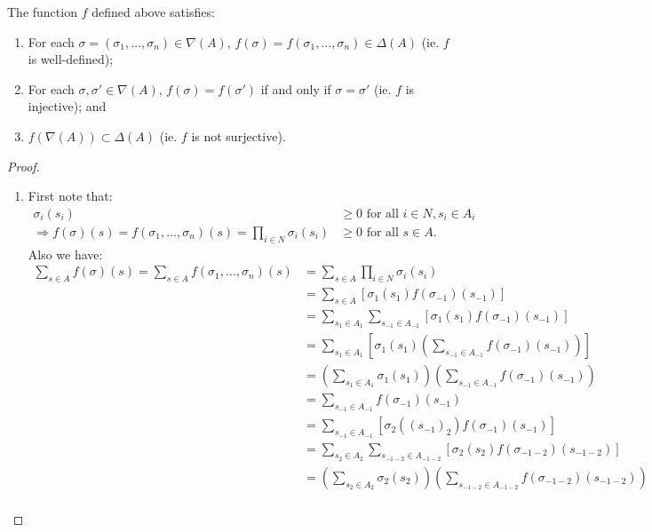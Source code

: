 	\begin{proposition}
		The function $f$ defined above satisfies:
		\begin{enumerate}
			\item For each $\sigma = (\sigma_1, \ldots, \sigma_n) \in \nabla(A)$, $f(\sigma) = f(\sigma_1, \ldots, \sigma_n) \in \Delta(A)$ (ie. $f$ is well-defined);
			\item For each $\sigma, \sigma' \in \nabla(A)$, $f(\sigma) = f(\sigma')$ if and only if $\sigma = \sigma'$ (ie. $f$ is injective); and
			\item $f\left(\nabla(A)\right) \subset \Delta(A)$ (ie. $f$ is not surjective).
		\end{enumerate}
		
		\begin{proof}
			\begin{enumerate}
				\item First note that:
				\begin{align*}
					\sigma_i(s_i) &\geq 0 \text{ for all } i \in N, s_i \in A_i \\
					\Rightarrow f(\sigma)(s) = f(\sigma_1, \ldots, \sigma_n)(s) = \prod_{i \in N} \sigma_i(s_i) &\geq 0 \text{ for all } s \in A.
				\end{align*}
				Also we have:
				\begin{align*}
					\sum_{s \in A}f(\sigma)(s) = \sum_{s \in A}f(\sigma_1, \ldots, \sigma_n)(s) &= \sum_{s \in A}\prod_{i \in N}\sigma_i(s_i) \\
					&= \sum_{s \in A}\left[\sigma_1(s_1)f(\sigma_{-1})(s_{-1})\right] \\
					&= \sum_{s_1 \in A_1}\sum_{s_{-1} \in A_{-1}}\left[\sigma_1(s_1)f(\sigma_{-1})(s_{-1})\right] \\
					&= \sum_{s_1 \in A_1}\left[\sigma_1(s_1)\left(\sum_{s_{-1} \in A_{-1}}f(\sigma_{-1})(s_{-1})\right)\right] \\
					&= \left(\sum_{s_1 \in A_1}\sigma_1(s_1)\right)\left(\sum_{s_{-1} \in A_{-1}}f(\sigma_{-1})(s_{-1})\right) \\
					&= \sum_{s_{-1} \in A_{-1}}f(\sigma_{-1})(s_{-1}) \\
					&= \sum_{s_{-1} \in A_{-1}} \left[\sigma_2({(s_{-1})}_2)f(\sigma_{-1})(s_{-1})\right] \\
					&= \sum_{s_2 \in A_2}\sum_{s_{-1-2} \in A_{-1-2}} \left[\sigma_2(s_{2})f(\sigma_{-1-2})(s_{-1-2})\right] \\
					&= \left(\sum_{s_2 \in A_2} \sigma_2(s_{2})\right) \left(\sum_{s_{-1-2} \in A_{-1-2}} f(\sigma_{-1-2})(s_{-1-2})\right) \\

\end{align*}
\end{enumerate}
\end{proof}
\end{proposition}
